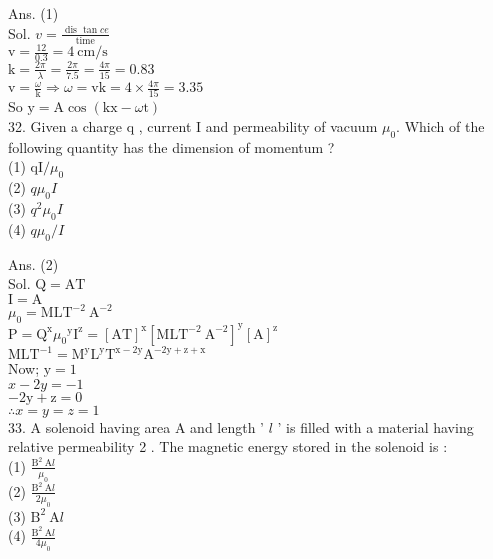\documentclass[10pt]{article}
\begin{document}
Ans. (1)\\
Sol. \(v=\frac{\text { dis } \tan c e}{\text { time }}\)\\
\(\mathrm{v}=\frac{12}{0.3}=4 \mathrm{~cm} / \mathrm{s}\)\\
\(\mathrm{k}=\frac{2 \pi}{\lambda}=\frac{2 \pi}{7.5}=\frac{4 \pi}{15}=0.83\)\\
\(\mathrm{v}=\frac{\omega}{\mathrm{k}} \Rightarrow \omega=\mathrm{vk}=4 \times \frac{4 \pi}{15}=3.35\)\\
So \(\mathrm{y}=\mathrm{A} \cos (\mathrm{kx}-\omega \mathrm{t})\)\\
32. Given a charge q , current I and permeability of vacuum \(\mu_{0}\). Which of the following quantity has the dimension of momentum ?\\
(1) \(\mathrm{qI} / \mu_{0}\)\\
(2) \(q \mu_{0} I\)\\
(3) \(q^{2} \mu_{0} I\)\\
(4) \(q \mu_{0} / I\)

Ans. (2)\\
Sol. \(\mathrm{Q}=\mathrm{AT}\)\\
\(\mathrm{I}=\mathrm{A}\)\\
\(\mu_{0}=\mathrm{MLT}^{-2} \mathrm{~A}^{-2}\)\\
\(\mathrm{P}=\mathrm{Q}^{\mathrm{x}} \mu_{0}{ }^{\mathrm{y}} \mathrm{I}^{\mathrm{z}}=[\mathrm{AT}]^{\mathrm{x}}\left[\mathrm{MLT}^{-2} \mathrm{~A}^{-2}\right]^{\mathrm{y}}[\mathrm{A}]^{\mathrm{z}}\)\\
\(\mathrm{MLT}^{-1}=\mathrm{M}^{\mathrm{y}} \mathrm{L}^{\mathrm{y}} \mathrm{T}^{\mathrm{x}-2 \mathrm{y}} \mathrm{A}^{-2 \mathrm{y}+\mathrm{z}+\mathrm{x}}\)\\
Now; \(\mathrm{y}=1\)\\
\(x-2 y=-1\)\\
\(-2 \mathrm{y}+\mathrm{z}=0\)\\
\(\therefore x=y=z=1\)\\
33. A solenoid having area A and length ' \(l\) ' is filled with a material having relative permeability 2 . The magnetic energy stored in the solenoid is :\\
(1) \(\frac{\mathrm{B}^{2} \mathrm{~A} l}{\mu_{0}}\)\\
(2) \(\frac{\mathrm{B}^{2} \mathrm{~A} l}{2 \mu_{0}}\)\\
(3) \(\mathrm{B}^{2} \mathrm{~A} l\)\\
(4) \(\frac{\mathrm{B}^{2} \mathrm{~A} l}{4 \mu_{0}}\)
\end{document}
